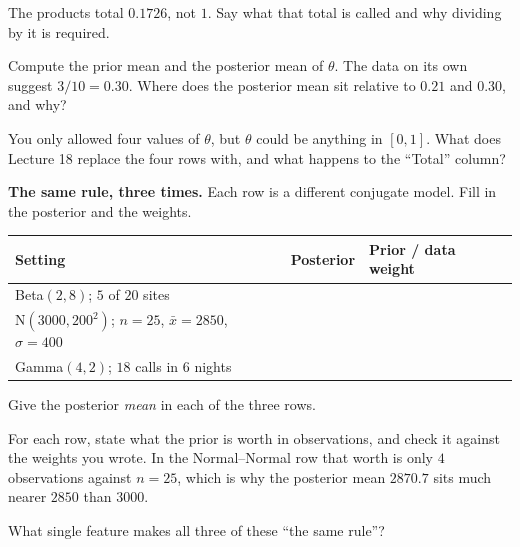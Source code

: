 \documentclass[11pt]{article}
\newcommand{\answerspace}[1]{\vspace{#1}}
\begin{document}
\begin{questions}
\begin{parts}
\item The products total $0.1726$, not $1$. Say what that total is called and why dividing by it is
required.
\answerspace{3.5em}

\item Compute the prior mean and the posterior mean of $\theta$. The data on its own suggest
$3/10 = 0.30$. Where does the posterior mean sit relative to $0.21$ and $0.30$, and why?
\answerspace{3.5em}

\item You only allowed four values of $\theta$, but $\theta$ could be anything in $[0,1]$. What
does Lecture 18 replace the four rows with, and what happens to the ``Total'' column?
\answerspace{3.2em}
\end{parts}

\item \textbf{The same rule, three times.} Each row is a different conjugate model. Fill in the
posterior and the weights.

\begin{center}
\renewcommand{\arraystretch}{1.3}
\begin{tabularx}{\linewidth}{LLL}
\toprule
\textbf{Setting} & \textbf{Posterior} & \textbf{Prior / data weight} \\
\midrule
Beta$(2,8)$; $5$ of $20$ sites & & \\
N$(3000,200^2)$; $n=25$, $\bar{x}=2850$, $\sigma=400$ & & \\
Gamma$(4,2)$; $18$ calls in $6$ nights & & \\
\bottomrule
\end{tabularx}
\end{center}

\begin{parts}
\item Give the posterior \emph{mean} in each of the three rows.
\answerspace{3.2em}

\item For each row, state what the prior is worth in observations, and check it against the weights
you wrote. In the Normal--Normal row that worth is only $4$ observations against $n = 25$, which is
why the posterior mean $2870.7$ sits much nearer $2850$ than $3000$.
\answerspace{3.5em}

\item What single feature makes all three of these ``the same rule''?
\answerspace{3em}
\end{parts}


\end{questions}
\end{document}
